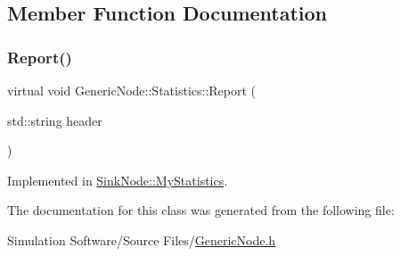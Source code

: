 \subsection{Member Function Documentation}
\mbox{\label{class_generic_node_1_1_statistics_ada017fd13bc1b6704d6c7d15ba9ed8df}} 
\subsubsection{\texorpdfstring{Report()}{Report()}}
{\footnotesize\ttfamily virtual void Generic\+Node\+::\+Statistics\+::\+Report (\begin{DoxyParamCaption}\item[{std\+::string}]{header }\end{DoxyParamCaption})\hspace{0.3cm}{\ttfamily [pure virtual]}}



Implemented in \hyperlink{class_sink_node_1_1_my_statistics_acd304ae3a9892c9de454dc7ee36a942b}{Sink\+Node\+::\+My\+Statistics}.



The documentation for this class was generated from the following file\+:\begin{DoxyCompactItemize}
\item 
Simulation Software/\+Source Files/\hyperlink{_generic_node_8h}{Generic\+Node.\+h}\end{DoxyCompactItemize}
